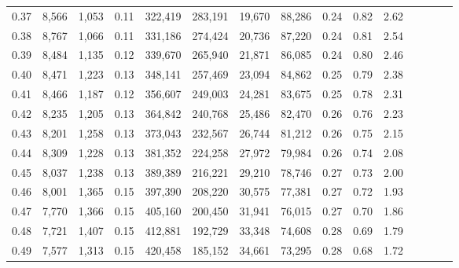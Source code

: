 \begin{tabular}{rrrcrrrrrrrrrrr}
0.37 &   8,566 &   1,053 &                                       0.11 &  322,419 &  283,191 &   19,670 &   88,286 &  0.24 &  0.82 &                         2.62 \\
0.38 &   8,767 &   1,066 &                                       0.11 &  331,186 &  274,424 &   20,736 &   87,220 &  0.24 &  0.81 &                         2.54 \\
0.39 &   8,484 &   1,135 &                                       0.12 &  339,670 &  265,940 &   21,871 &   86,085 &  0.24 &  0.80 &                         2.46 \\
0.40 &   8,471 &   1,223 &                                       0.13 &  348,141 &  257,469 &   23,094 &   84,862 &  0.25 &  0.79 &                         2.38 \\
0.41 &   8,466 &   1,187 &                                       0.12 &  356,607 &  249,003 &   24,281 &   83,675 &  0.25 &  0.78 &                         2.31 \\
0.42 &   8,235 &   1,205 &                                       0.13 &  364,842 &  240,768 &   25,486 &   82,470 &  0.26 &  0.76 &                         2.23 \\
0.43 &   8,201 &   1,258 &                                       0.13 &  373,043 &  232,567 &   26,744 &   81,212 &  0.26 &  0.75 &                         2.15 \\
0.44 &   8,309 &   1,228 &                                       0.13 &  381,352 &  224,258 &   27,972 &   79,984 &  0.26 &  0.74 &                         2.08 \\
0.45 &   8,037 &   1,238 &                                       0.13 &  389,389 &  216,221 &   29,210 &   78,746 &  0.27 &  0.73 &                         2.00 \\
0.46 &   8,001 &   1,365 &                                       0.15 &  397,390 &  208,220 &   30,575 &   77,381 &  0.27 &  0.72 &                         1.93 \\
0.47 &   7,770 &   1,366 &                                       0.15 &  405,160 &  200,450 &   31,941 &   76,015 &  0.27 &  0.70 &                         1.86 \\
0.48 &   7,721 &   1,407 &                                       0.15 &  412,881 &  192,729 &   33,348 &   74,608 &  0.28 &  0.69 &                         1.79 \\
0.49 &   7,577 &   1,313 &                                       0.15 &  420,458 &  185,152 &   34,661 &   73,295 &  0.28 &  0.68 &                         1.72 \\

\end{tabular}
